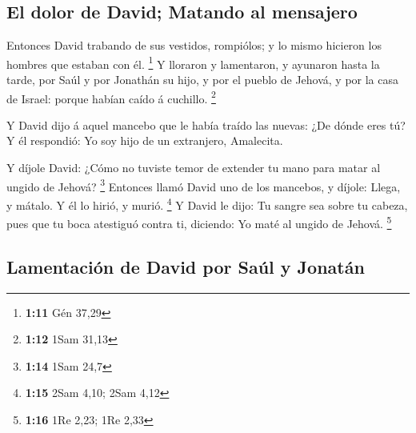\hypertarget{el-dolor-de-david-matando-al-mensajero}{%
\subsection{El dolor de David; Matando al
mensajero}\label{el-dolor-de-david-matando-al-mensajero}}

 Entonces David trabando de sus vestidos, rompiólos; y lo
mismo hicieron los hombres que estaban con él. \footnote{\textbf{1:11}
  Gén 37,29}  Y lloraron y lamentaron, y ayunaron hasta la
tarde, por Saúl y por Jonathán su hijo, y por el pueblo de Jehová, y por
la casa de Israel: porque habían caído á cuchillo. \footnote{\textbf{1:12}
  1Sam 31,13}

 Y David dijo á aquel mancebo que le había traído las
nuevas: ¿De dónde eres tú? Y él respondió: Yo soy hijo de un extranjero,
Amalecita.

 Y díjole David: ¿Cómo no tuviste temor de extender tu mano
para matar al ungido de Jehová? \footnote{\textbf{1:14} 1Sam 24,7}
 Entonces llamó David uno de los mancebos, y díjole: Llega,
y mátalo. Y él lo hirió, y murió. \footnote{\textbf{1:15} 2Sam 4,10;
  2Sam 4,12}  Y David le dijo: Tu sangre sea sobre tu
cabeza, pues que tu boca atestiguó contra ti, diciendo: Yo maté al
ungido de Jehová. \footnote{\textbf{1:16} 1Re 2,23; 1Re 2,33}

\hypertarget{lamentaciuxf3n-de-david-por-sauxfal-y-jonatuxe1n}{%
\subsection{Lamentación de David por Saúl y
Jonatán}\label{lamentaciuxf3n-de-david-por-sauxfal-y-jonatuxe1n}}

